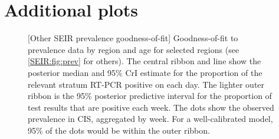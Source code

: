 \documentclass[thesis.tex]{subfiles}
\begin{document}
\chapter{Additional plots}

\begin{figure}
    \vspace{-3cm}
    \captionsetup{width=0.8\paperwidth}
    [Other SEIR prevalence goodness-of-fit]{%
        Goodness-of-fit to prevalence data by region and age for selected regions (see \cref{SEIR:fig:prev} for others).
        The central ribbon and line show the posterior median and 95\% CrI estimate for the proportion of the relevant stratum RT-PCR positive on each day.
        The lighter outer ribbon is the 95\% posterior predictive interval for the proportion of test results that are positive each week.
        The dots show the observed prevalence in CIS, aggregated by week.
        For a well-calibrated model, 95\% of the dots would be within the outer ribbon.
    }
    \label{SEIR:fig:prev-appendix}
\end{figure}
\end{document}
